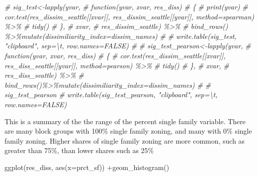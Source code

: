 \documentclass[
]{article}
\newenvironment{Shaded}{\begin{snugshade}}{\end{snugshade}}
\newcommand{\AttributeTok}[1]{\textcolor[rgb]{0.77,0.63,0.00}{#1}}
\newcommand{\CommentTok}[1]{\textcolor[rgb]{0.56,0.35,0.01}{\textit{#1}}}
\newcommand{\FunctionTok}[1]{\textcolor[rgb]{0.00,0.00,0.00}{#1}}
\newcommand{\NormalTok}[1]{#1}
\newcommand{\SpecialCharTok}[1]{\textcolor[rgb]{0.00,0.00,0.00}{#1}}
\begin{document}
\begin{Shaded}
\begin{Highlighting}[]
\CommentTok{\# sig\_test\textless{}{-}lapply(yvar,}
\CommentTok{\#        function(yvar, xvar, res\_diss)}
\CommentTok{\#        \{}
\CommentTok{\#          print(yvar)}
\CommentTok{\#          cor.test(res\_dissim\_seattle[[xvar]], res\_dissim\_seattle[[yvar]], method=\textquotesingle{}spearman\textquotesingle{}) \%\textgreater{}\%}
\CommentTok{\#            tidy()}
\CommentTok{\#        \},}
\CommentTok{\#        xvar,}
\CommentTok{\#        res\_dissim\_seattle) \%\textgreater{}\%}
\CommentTok{\#   bind\_rows() \%\textgreater{}\%mutate(\textquotesingle{}dissimiliarity\_index\textquotesingle{}=dissim\_names)}
\CommentTok{\# }
\CommentTok{\# write.table(sig\_test, "clipboard", sep=\textquotesingle{}\textbackslash{}t\textquotesingle{}, row.names=FALSE)}
\CommentTok{\# }
\CommentTok{\# sig\_test\_pearson\textless{}{-}lapply(yvar,}
\CommentTok{\#        function(yvar, xvar, res\_diss)}
\CommentTok{\#        \{}
\CommentTok{\#          cor.test(res\_dissim\_seattle[[xvar]], res\_diss\_seattle[[yvar]], method=\textquotesingle{}pearson\textquotesingle{}) \%\textgreater{}\%}
\CommentTok{\#            tidy()}
\CommentTok{\#        \},}
\CommentTok{\#        xvar,}
\CommentTok{\#        res\_diss\_seattle) \%\textgreater{}\%}
\CommentTok{\#   bind\_rows()\%\textgreater{}\%mutate(\textquotesingle{}dissimiliarity\_index\textquotesingle{}=dissim\_names)}
\CommentTok{\# }
\CommentTok{\# sig\_test\_pearson}
\CommentTok{\# write.table(sig\_test\_pearson, "clipboard", sep=\textquotesingle{}\textbackslash{}t\textquotesingle{}, row.names=FALSE)}
\end{Highlighting}
\end{Shaded}

This is a summary of the the range of the percent single family
variable. There are many block groups with 100\% single family zoning,
and many with 0\% single family zoning. Higher shares of single family
zoning are more common, such as greater than 75\%, than lower shares
such as 25\%

\begin{Shaded}
\begin{Highlighting}[]
\FunctionTok{ggplot}\NormalTok{(res\_diss, }\FunctionTok{aes}\NormalTok{(}\AttributeTok{x=}\NormalTok{prct\_sf)) }\SpecialCharTok{+}\FunctionTok{geom\_histogram}\NormalTok{()}
\end{Highlighting}
\end{Shaded}
\end{document}

